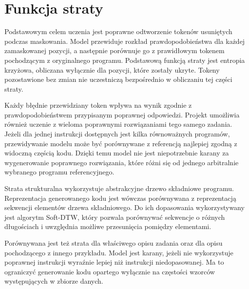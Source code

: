
\section{Funkcja straty}
\label{sec:strata}

Podstawowym celem uczenia jest poprawne odtworzenie tokenów usuniętych podczas maskowania. Model przewiduje rozkład prawdopodobieństwa dla każdej zamaskowanej pozycji, a następnie porównuje go z prawidłowym tokenem pochodzącym z oryginalnego programu. Podstawową funkcją straty jest entropia krzyżowa, obliczana wyłącznie dla pozycji, które zostały ukryte. Tokeny pozostawione bez zmian nie uczestniczą bezpośrednio w obliczaniu tej części straty.

Każdy błędnie przewidziany token wpływa na wynik zgodnie z prawdopodobieństwem przypisanym poprawnej odpowiedzi. Projekt umożliwia również uczenie z wieloma poprawnymi rozwiązaniami tego samego zadania. Jeżeli dla jednej instrukcji dostępnych jest kilka równoważnych programów, przewidywanie modelu może być porównywane z referencją najlepiej zgodną z widoczną częścią kodu. Dzięki temu model nie jest niepotrzebnie karany za wygenerowanie poprawnego rozwiązania, które różni się od jednego arbitralnie wybranego programu referencyjnego.

Strata strukturalna wykorzystuje abstrakcyjne drzewo składniowe programu. Reprezentacja generowanego kodu jest wówczas porównywana z reprezentacją sekwencji elementów drzewa składniowego. Do ich dopasowania wykorzystywany jest algorytm Soft-DTW, który pozwala porównywać sekwencje o różnych długościach i uwzględnia możliwe przesunięcia pomiędzy elementami.

Porównywana jest też strata dla właściwego opisu zadania oraz dla opisu pochodzącego z innego przykładu. Model jest karany, jeżeli nie wykorzystuje poprawnej instrukcji wyraźnie lepiej niż instrukcji niedopasowanej. Ma to ograniczyć generowanie kodu opartego wyłącznie na częstości wzorców występujących w zbiorze danych.
